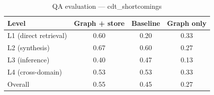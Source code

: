 \begin{table}[h]
\centering
\caption{QA evaluation — cdt_shortcomings}
\begin{tabular}{lccc}
\toprule
Level & Graph + store & Baseline & Graph only \\
\midrule
L1 (direct retrieval) & 0.60 & 0.20 & 0.33 \\
L2 (synthesis) & 0.67 & 0.60 & 0.27 \\
L3 (inference) & 0.40 & 0.47 & 0.13 \\
L4 (cross-domain) & 0.53 & 0.53 & 0.33 \\
\midrule
Overall & 0.55 & 0.45 & 0.27 \\
\bottomrule
\end{tabular}
\end{table}